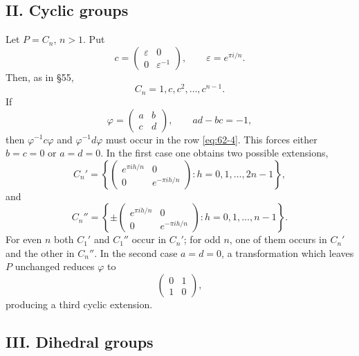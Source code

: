 \documentclass[11pt,a4paper]{article}
\newcommand{\eps}{\varepsilon}
\begin{document}
\subsection*{II. Cyclic groups}

Let \(P=C_n\), \(n>1\).  Put
\begin{equation}\label{eq:62-3}
 c=\begin{pmatrix}\eps&0\\0&\eps^{-1}\end{pmatrix},
 \qquad \eps=e^{\pi i/n}.
\end{equation}
Then, as in \S 55,
\begin{equation}\label{eq:62-4}
 C_n=1,c,c^2,\ldots,c^{n-1}.
\end{equation}
If
\begin{equation}\label{eq:62-5}
 \varphi=\begin{pmatrix}a&b\\c&d\end{pmatrix},
 \qquad ad-bc=-1,
\end{equation}
then \(\varphi^{-1}c\varphi\) and \(\varphi^{-1}d\varphi\) must occur in the row \eqref{eq:62-4}.  This forces either \(b=c=0\) or \(a=d=0\).  In the first case one obtains two possible extensions,
\begin{equation}\label{eq:62-7}
 C_n'=
 \left\{
 \begin{pmatrix}e^{\pi ih/n}&0\\0&e^{-\pi ih/n}\end{pmatrix}:h=0,1,\ldots,2n-1
 \right\},
\end{equation}
and
\begin{equation}\label{eq:62-8}
 C_n''=
 \left\{
 \pm\begin{pmatrix}e^{\pi ih/n}&0\\0&e^{-\pi ih/n}\end{pmatrix}:h=0,1,\ldots,n-1
 \right\}.
\end{equation}
For even \(n\) both \(C_1'\) and \(C_1''\) occur in \(C_n'\); for odd \(n\), one of them occurs in \(C_n'\) and the other in \(C_n''\).  In the second case \(a=d=0\), a transformation which leaves \(P\) unchanged reduces \(\varphi\) to
\[
 \begin{pmatrix}0&1\\1&0\end{pmatrix},
\]
producing a third cyclic extension.

\subsection*{III. Dihedral groups}
\end{document}
